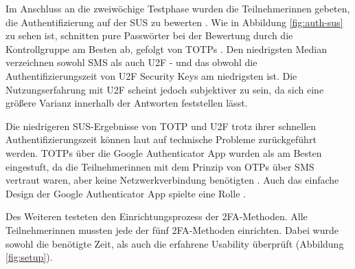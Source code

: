 Im Anschluss an die zweiwöchige Testphase wurden die Teilnehmerinnen gebeten, die Authentifizierung auf der \ac{SUS} zu bewerten \parencite{reeseUsabilityStudy2019}. Wie in Abbildung \ref{fig:auth-sus} zu sehen ist, schnitten pure Passwörter bei der Bewertung durch die Kontrollgruppe am Besten ab, gefolgt von \acp{TOTP} \parencite{reeseUsabilityStudy2019}. Den niedrigsten Median verzeichnen sowohl SMS als auch \ac{U2F} - und das obwohl die Authentifizierungszeit von \ac{U2F} Security Keys am niedrigsten ist. Die Nutzungserfahrung mit \ac{U2F} scheint jedoch subjektiver zu sein, da sich eine größere Varianz innerhalb der Antworten feststellen lässt.

Die niedrigeren \ac{SUS}-Ergebnisse von \ac{TOTP} und \ac{U2F} trotz ihrer schnellen Authentifizierungszeit können laut \textcite{reeseUsabilityStudy2019} auf technische Probleme zurückgeführt werden. \acp{TOTP} über die Google Authenticator App wurden als am Besten eingestuft, da die Teilnehmerinnen mit dem Prinzip von \acp{OTP} über SMS vertraut waren, aber keine Netzwerkverbindung benötigten \parencite{reeseUsabilityStudy2019}. Auch das einfache Design der Google Authenticator App spielte eine Rolle \parencite{reeseUsabilityStudy2019}.

\pskip
Des Weiteren testeten \textcite{reeseUsabilityStudy2019} den Einrichtungsprozess der \ac{2FA}-Methoden. Alle Teilnehmerinnen mussten jede der fünf \ac{2FA}-Methoden einrichten. Dabei wurde sowohl die benötigte Zeit, als auch die erfahrene Usability überprüft (Abbildung \ref{fig:setup}).


